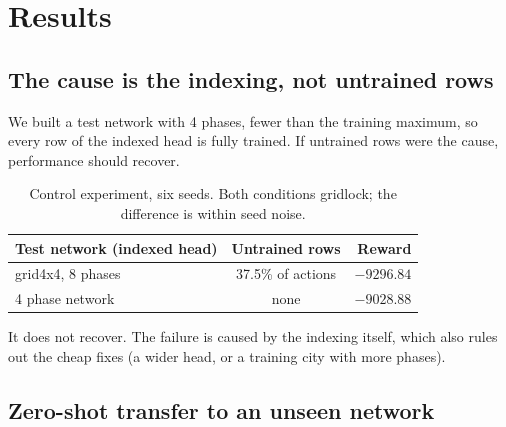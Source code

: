 \documentclass[10pt,twocolumn,a4paper]{article}
\begin{document}
\section{Results}

\subsection{The cause is the indexing, not untrained rows}\label{sec:control}
We built a test network with 4 phases, fewer than the training maximum, so every row of the
indexed head is fully trained. If untrained rows were the cause, performance should recover.

\begin{table}[H]
\centering\footnotesize
\begin{tabular}{|l|c|r|}
\hline
Test network (indexed head) & Untrained rows & Reward \\ \hline
grid4x4, 8 phases & 37.5\% of actions & $-9296.84$ \\ \hline
4 phase network & none & $-9028.88$ \\ \hline
\end{tabular}
\caption{Control experiment, six seeds. Both conditions gridlock; the difference is within
seed noise.}
\label{tab:control}
\end{table}

It does not recover. The failure is caused by the indexing itself, which also rules out the
cheap fixes (a wider head, or a training city with more phases).

\subsection{Zero-shot transfer to an unseen network}
\begin{table}[H]
\centering\footnotesize
\setlength{\tabcolsep}{3pt}
\caption{Reward on the unseen network, six seeds, all six favouring phase-relational in every
row. A fifth configuration (light demand) gives the same result. ``Fully RESCO'' also uses
RESCO's route files and evaluation hour.}
\label{tab:zs}
\end{table}
\end{document}
